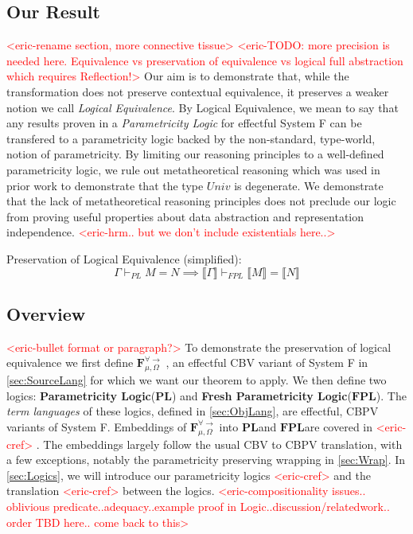 \documentclass[acmsmall]{acmart}
\newcommand{\den}[1]{\llbracket #1\rrbracket}
\newcommand{\eric}[1]{\textcolor{red}{ <eric-#1> }}
\newcommand{\source}{$\mathbf{F}_{\mu,\Omega}^{\forall\to}\;$}
\newcommand{\pl}{$\mathbf{PL}$}
\newcommand{\fpl}{$\mathbf{FPL}$}
\begin{document}
\subsection{Our Result}
\eric{rename section, more connective tissue}
\eric{TODO: more precision is needed here. Equivalence vs preservation of equivalence vs logical full abstraction which requires Reflection!}
Our aim is to demonstrate that, while the transformation does not preserve contextual equivalence, it preserves a weaker notion we call \textit{Logical Equivalence}. By Logical Equivalence, we mean to say that any results proven in a \textit{Parametricity Logic}\cite{APL}\cite{LAPL}\cite{PE} for effectful System F can be transfered to a parametricity logic backed by the non-standard, type-world, notion of parametricity. By limiting our reasoning principles to a well-defined parametricity logic, we rule out metatheoretical reasoning which was used in prior work\cite{TwoParamVSThreeUniv} to demonstrate that the type $Univ$ is degenerate. We demonstrate that the lack of metatheoretical reasoning principles does not preclude our logic from proving useful properties about data abstraction and representation independence. \eric{hrm.. but we don't include existentials here..}

\begin{theorem}
  Preservation of Logical Equivalence (simplified):
  $$\Gamma \vdash_{PL} M = N \implies \den{\Gamma} \vdash_{FPL} \den{M} = \den{N}$$
\end{theorem}



\subsection{Overview}

\eric{bullet format or paragraph?}
 To demonstrate the preservation of logical equivalence we first define \source, an effectful CBV variant of System F in \cref{sec:SourceLang} for which we want our theorem to apply. We then define two logics: \textbf{Parametricity Logic}(\pl) and \textbf{Fresh Parametricity Logic}(\fpl). The \textit{term languages} of these logics, defined in \cref{sec:ObjLang}, are effectful, CBPV \cite{CBPV} variants of System F. Embeddings of \source into \pl and \fpl are covered in \eric{cref}. The embeddings largely follow the usual\cite{CBPV} CBV to CBPV translation, with a few exceptions, notably the parametricity preserving wrapping in \cref{sec:Wrap}. In \cref{sec:Logics}, we will introduce our parametricity logics\eric{cref} and the translation \eric{cref} between the logics.
 \eric{compositionality issues.. oblivious predicate..adequacy..example proof in Logic..discussion/relatedwork.. order TBD here.. come back to this}
\end{document}
